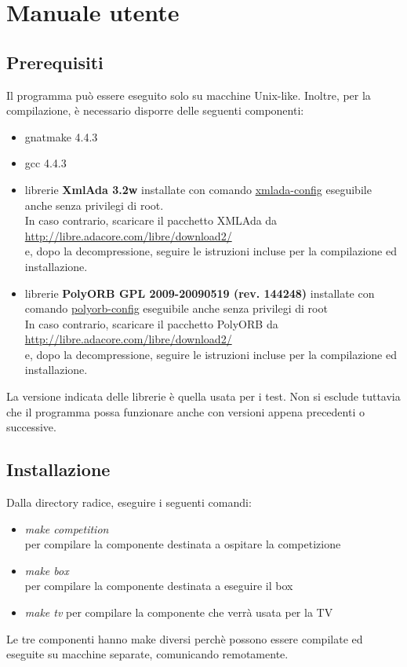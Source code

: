 \section{Manuale utente}
\subsection{Prerequisiti}
Il programma pu\`{o} essere eseguito solo su macchine Unix-like. Inoltre, per la compilazione,
\`{e} necessario disporre delle seguenti componenti:
\begin{itemize}
\item gnatmake 4.4.3
\item gcc 4.4.3
\item librerie \textbf{XmlAda 3.2w} installate con comando \underline{xmlada-config} eseguibile anche senza privilegi di root.\\
In caso contrario, scaricare il pacchetto XMLAda da\\
\url{http://libre.adacore.com/libre/download2/}\\
e, dopo la decompressione, seguire le istruzioni incluse per la compilazione ed installazione.
\item librerie \textbf{PolyORB GPL 2009-20090519 (rev. 144248)} installate con comando \underline{polyorb-config} eseguibile anche 
senza privilegi di root\\
In caso contrario, scaricare il pacchetto PolyORB da\\
\url{http://libre.adacore.com/libre/download2/}\\
e, dopo la decompressione, seguire le istruzioni incluse per la compilazione ed installazione.
\end{itemize}
La versione indicata delle librerie \`{e} quella usata per i test. Non si esclude tuttavia che il programma possa funzionare anche con versioni
appena precedenti o successive.
\subsection{Installazione}
Dalla directory radice, eseguire i seguenti comandi:
\begin{itemize}
\item \emph{make competition}\\
per compilare la componente destinata a ospitare la competizione
\item \emph{make box}\\
per compilare la componente destinata a eseguire il box
\item \emph{make tv}
per compilare la componente che verr\`{a} usata per la TV
\end{itemize}
Le tre componenti hanno make diversi perch\`{e} possono essere compilate ed eseguite su macchine separate, comunicando remotamente.
